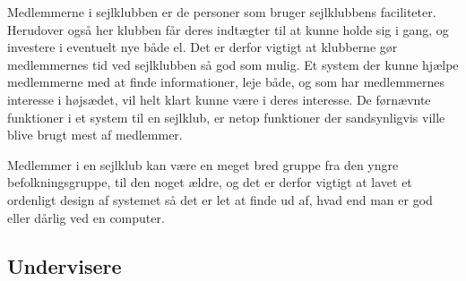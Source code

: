 Medlemmerne i sejlklubben er de personer som bruger sejlklubbens faciliteter. Herudover også her klubben får deres
indtægter til at kunne holde sig i gang, og investere i eventuelt nye både el.  Det er derfor vigtigt at klubberne gør medlemmernes tid ved sejlklubben
så god som mulig. Et system der kunne hjælpe medlemmerne med at finde informationer, leje både, og som har
medlemmernes interesse i højsædet, vil helt klart kunne være i deres interesse. De førnævnte funktioner i et system til
en sejlklub, er netop funktioner der sandsynligvis ville blive brugt mest af medlemmer.

Medlemmer i en sejlklub kan være en meget bred gruppe fra den yngre befolkningsgruppe, til den noget ældre, og det er
derfor vigtigt at lavet et ordenligt design af systemet så det er let at finde ud af, hvad end man er god eller dårlig ved en
computer.





\subsection{Undervisere}


